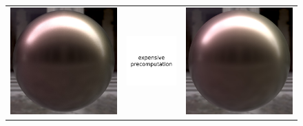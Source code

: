 \begin{figure}[t]
\begin{tabular}{ccc}
		\includegraphics[width=0.315\columnwidth]{img/validations/compare2/sphere_layered_1024spp_37min.jpg} &
		\includegraphics[width=0.315\columnwidth]{img/validations/compare2/na2.pdf} &
		\includegraphics[width=0.315\columnwidth]{img/validations/compare2/sphere_laurent_1024spp_1_5min.jpg} \\
		

\end{tabular}
\end{figure}
